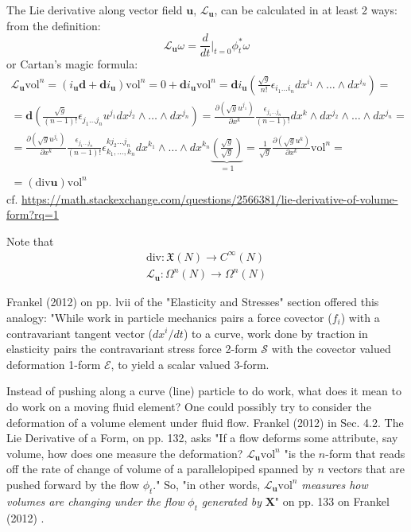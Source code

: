 \documentclass[10pt]{amsart}
\begin{document}
\begin{multicols*}{2}
The Lie derivative along vector field $\mathbf{u}$, $\mathcal{L}_{\mathbf{u}}$, can be calculated in at least 2 ways: from the definition:
\[
\mathcal{L}_{\mathbf{u}} \omega  =\frac{d}{dt} \left. \right|_{t = 0} \phi_t^*\omega
\]
or Cartan's magic formula:
\begin{equation}
\begin{gathered}
	\mathcal{L}_{\mathbf{u}} \text{vol}^n = (i_{\mathbf{u}}\mathbf{d} + \mathbf{d}i_{\mathbf{u}}) \text{vol}^n = 0 + \mathbf{d}i_{\mathbf{u}} \text{vol}^n = \mathbf{d}i_{\mathbf{u}} \left( \frac{ \sqrt{g}}{n!} \epsilon_{i_1 \dots i_n} dx^{i_1} \wedge \dots \wedge dx^{i_n} \right) = \\ 
	= \mathbf{d} \left( \frac{\sqrt{g}}{(n-1)! } \epsilon_{j_1 \dots j_n} u^{j_1} dx^{j_2} \wedge \dots \wedge dx^{j_n} \right) = \frac{ \partial (\sqrt{g} u^{j_1} )}{ \partial x^k} \frac{ \epsilon_{j_1 \dots j_n}}{(n-1)!} dx^k \wedge dx^{j_2} \wedge \dots \wedge dx^{j_n} = \\
	= \frac{ \partial (\sqrt{g} u^{j_1}) }{ \partial x^k} \frac{ \epsilon_{j_1 \dots j_n} }{ (n-1)! } \epsilon^{k j_2 \dots j_n}_{ k_1, \dots, k_n} dx^{k_1} \wedge \dots \wedge dx^{k_n} \underbrace{\left( \frac{ \sqrt{g}}{ \sqrt{g}} \right)}_{=1} = \frac{1}{\sqrt{g}} \frac{ \partial ( \sqrt{g} u^k) }{ \partial x^k} \text{vol}^n =  \\
	= (\text{div}{\mathbf{u}}) \text{vol}^n
\end{gathered}
\end{equation}
cf. \url{https://math.stackexchange.com/questions/2566381/lie-derivative-of-volume-form?rq=1}

Note that
\[
\begin{gathered}
	\text{div}: \mathfrak{X}(N) \to C^{\infty}(N) \\ 
 \mathcal{L}_{\mathbf{u}}: \Omega^n(N) \to \Omega^n(N) 
\end{gathered}
\]

Frankel (2012) \cite{TFrankel2012} on pp. lvii of the "Elasticity and Stresses" section offered this analogy: "While work in particle mechanics pairs a force covector ($f_i$) with a contravariant tangent vector ($dx^i/dt$) to a curve, work done by traction in elasticity pairs the contravariant stress force 2-form $\mathcal{S}$ with the covector valued deformation 1-form $\mathcal{E}$, to yield a scalar valued 3-form.

Instead of pushing along a curve (line) particle to do work, what does it mean to do work on a moving fluid element? One could possibly try to consider the deformation of a volume element under fluid flow. Frankel (2012) \cite{TFrankel2012} in Sec. 4.2. The Lie Derivative of a Form, on pp. 132, asks "If a flow deforms some attribute, say volume, how does one measure the deformation? $\mathcal{L}_{\mathbf{u}}\text{vol}^n$ "is the $n$-form that reads off the rate of change of volume of a parallelopiped spanned by $n$ vectors that are pushed forward by the flow $\phi_t$." So, "in other words, $\mathcal{L}_{\mathbf{u}}\text{vol}^n$ \emph{measures how volumes are changing under the flow} $\phi_t$ \emph{generated by} $\mathbf{X}$" on pp. 133 on Frankel (2012) \cite{TFrankel2012}. 


\end{multicols*}
\end{document}
